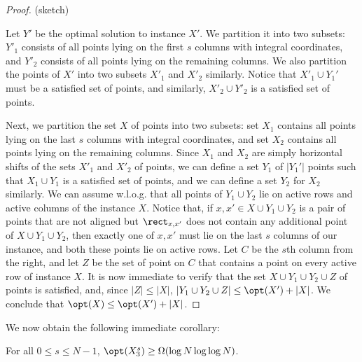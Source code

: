 \documentclass{toc}
\begin{document}
\begin{proof}
	(sketch)
	
	Let $Y'$ be the optimal solution to instance $X'$. We partition it into two subsets: $Y'_1$ consists of all points lying on the first $s$ columns with integral coordinates, and $Y'_2$ consists of all points lying on the remaining columns. We also partition the points of $X'$ into two subsets $X'_1$ and $X'_2$ similarly.  Notice that $X'_1\cup Y_1'$ must be a satisfied set of points, and similarly, $X'_2\cup Y'_2$ is a satisfied set of points.
	
	Next, we partition the set $X$ of points into two subsets: set $X_1$ contains all points lying on the last $s$ columns with integral coordinates, and set $X_2$ contains all points lying on the remaining columns. Since $X_1$ and $X_2$ are simply horizontal shifts of the sets $X'_1$ and $X'_2$ of points, we can define a set $Y_1$ of $|Y_1'|$ points such that $X_1\cup Y_1$ is a satisfied set of points, and we can define a set $Y_2$ for $X_2$ similarly. We can assume w.l.o.g. that all points of $Y_1\cup Y_2$ lie on active rows and active columns of the instance $X$. Notice that, if $x,x'\in X\cup Y_1\cup Y_2$ is a pair of points that are not aligned but $\rect_{x,x'}$ does not contain any additional point of $X\cup Y_1\cup Y_2$, then exactly one of $x,x'$ must lie on the last $s$ columns of our instance, and both these points lie on active rows. Let $C$ be the $s$th column from the right, and let $Z$ be the set of point on $C$ that contains a point on every active row of instance $X$. It is now immediate to verify that the set $X\cup Y_1\cup Y_2\cup Z$ of points is satisfied, and, since $|Z|\leq |X|$, $|Y_1\cup Y_2\cup Z|\leq \opt(X')+|X|$. We conclude that $\opt(X)\leq \opt(X')+|X|$.
\end{proof}
	
We now obtain the following immediate corollary:

\begin{corollary}\label{cor: large solution cost for shifted instance}
For all $0\leq s\leq N-1$, $\opt(X_3^s)\geq \Omega(\log N\log\log N)$.
\end{corollary}
\end{document}

